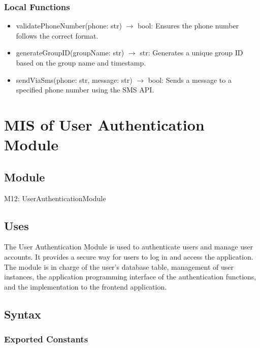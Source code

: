 \documentclass[12pt, titlepage]{article}
\begin{document}
\subsubsection{Local Functions}

\begin{itemize}
  \item validatePhoneNumber(phone: str) $\rightarrow$ bool: Ensures the phone number follows the correct format.
  \item generateGroupID(groupName: str) $\rightarrow$ str: Generates a unique group ID based on the group name and timestamp.
  \item sendViaSms(phone: str, message: str) $\rightarrow$ bool: Sends a message to a specified phone number using the SMS API.
\end{itemize}

\newpage


\section{MIS of User Authentication Module} \label{Module} 

\subsection{Module}

M12: UserAuthenticationModule

\subsection{Uses}

The User Authentication Module is used to authenticate users and manage user accounts. It provides a secure way for users to log in and access the application. The module is in charge of the user's database table, management of user instances, the application programming interface of the authentication functions, and the implementation to the frontend application.

\subsection{Syntax}

\subsubsection{Exported Constants}
\end{document}
